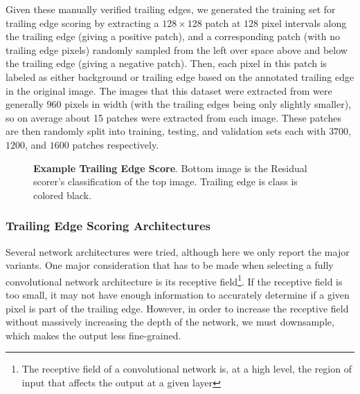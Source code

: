 Given these manually verified trailing edges, we generated the training set for trailing edge scoring by extracting a $128 \times 128$ patch at $128$ pixel intervals along the trailing edge (giving a positive patch), and a corresponding patch (with no trailing edge pixels) randomly sampled from the left over space above and below the trailing edge (giving a negative patch).
Then, each pixel in this patch is labeled as either background or trailing edge based on the annotated trailing edge in the original image.
The images that this dataset were extracted from were generally $960$ pixels in width (with the trailing edges being only slightly smaller), so on average about 15 patches were extracted from each image. 
These patches are then randomly split into training, testing, and validation sets each with $3700$, $1200$, and $1600$ patches respectively.



\begin{figure}[t]%
\centering
{}
\newline
{}
\caption{\textbf{Example Trailing Edge Score}. Bottom image is the Residual scorer's classification of the top image. Trailing edge is class is colored black.}
\label{fig:example_te_score_annotres}
\end{figure}



\subsubsection{Trailing Edge Scoring Architectures} 
\label{sec:te_arch}

Several network architectures were tried, although here we only report the major variants.
One major consideration that has to be made when selecting a fully convolutional network architecture is its receptive field\footnote{The receptive field of a convolutional network is, at a high level, the region of input that affects the output at a given layer}.
If the receptive field is too small, it may not have enough information to accurately determine if a given pixel is part of the trailing edge.
However, in order to increase the receptive field without massively increasing the depth of the network, we must downsample, which makes the output less fine-grained.

